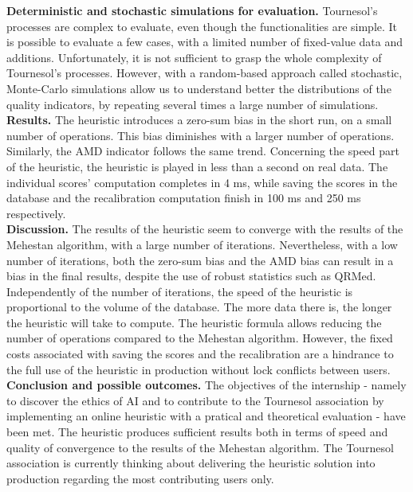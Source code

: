 \textbf{Deterministic and stochastic simulations for evaluation.} Tournesol's processes are complex to evaluate, even though the functionalities are simple. It is possible to evaluate a few cases, with a limited number of fixed-value data and additions. Unfortunately, it is not sufficient to grasp the whole complexity of Tournesol's processes. However, with a random-based approach called stochastic, Monte-Carlo simulations allow us to understand better the distributions of the quality 
indicators, by repeating several times a large number of simulations.\\
\textbf{Results.} The heuristic introduces a zero-sum bias in the short run, on a small number of operations. This bias diminishes with a larger number of operations. Similarly, the AMD indicator follows the same trend. Concerning the speed part of the heuristic, the heuristic is played
in less than a second on real data. The individual scores' computation completes in  4
ms, while saving the scores in the database and the recalibration computation finish in 100 ms and 250 ms respectively. \\
\textbf{Discussion.} The results of the heuristic seem to converge with the results of the Mehestan algorithm, with a large number of iterations. Nevertheless, with a low number of iterations, both the zero-sum bias and the AMD bias can result in a
bias in the final results, despite the use of robust statistics such as QRMed. Independently of the number of iterations, the speed of the heuristic
is proportional to the volume of the database. The more data there is, the longer the heuristic will take to compute. The heuristic formula allows reducing the number of operations compared to the Mehestan algorithm. However, the fixed costs associated with saving the scores and the recalibration are a hindrance to the full use of the heuristic in production without lock conflicts between users.\\
\textbf{Conclusion and possible outcomes.} The objectives of the internship - namely to discover the ethics of AI and to contribute to the Tournesol association by implementing an online heuristic with a pratical and theoretical evaluation - have been met.
The heuristic produces sufficient results both in terms of speed and quality of convergence to the results of the Mehestan algorithm. The Tournesol association is currently thinking about delivering the heuristic solution into production regarding the most contributing users only.
\pagebreak